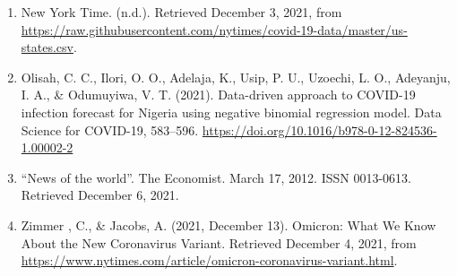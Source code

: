 \documentclass[
]{book}
\begin{document}
\begin{enumerate}
\def\labelenumi{\arabic{enumi}.}
\item
  New York Time. (n.d.). Retrieved December 3, 2021, from \url{https://raw.githubusercontent.com/nytimes/covid-19-data/master/us-states.csv}.
\item
  Olisah, C. C., Ilori, O. O., Adelaja, K., Usip, P. U., Uzoechi, L. O., Adeyanju, I. A., \& Odumuyiwa, V. T. (2021). Data-driven approach to COVID-19 infection forecast for Nigeria using negative binomial regression model. Data Science for COVID-19, 583--596. \url{https://doi.org/10.1016/b978-0-12-824536-1.00002-2}
\item
  ``News of the world''. The Economist. March 17, 2012. ISSN 0013-0613. Retrieved December 6, 2021.
\item
  Zimmer , C., \& Jacobs, A. (2021, December 13). Omicron: What We Know About the New Coronavirus Variant. Retrieved December 4, 2021, from \url{https://www.nytimes.com/article/omicron-coronavirus-variant.html}.
\end{enumerate}

  
\end{document}
